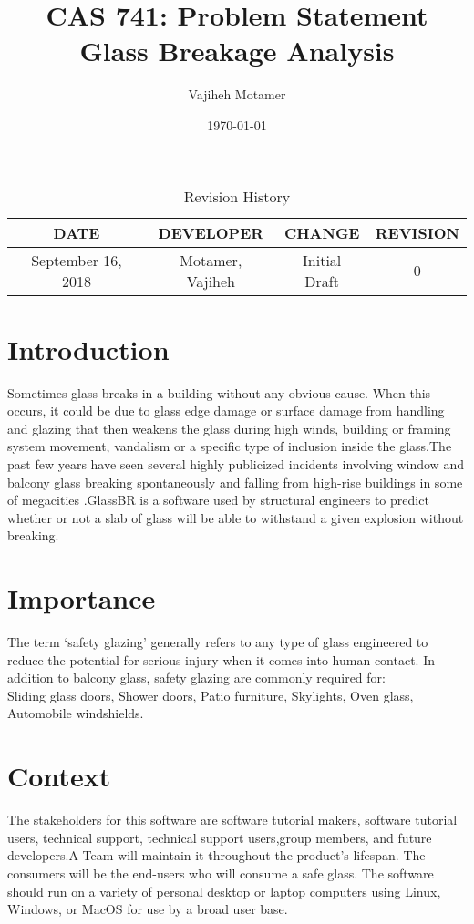 \documentclass[12pt,letterpaper]{article}
\title{CAS 741: Problem Statement\\Glass Breakage Analysis}
\author{Vajiheh Motamer}
\date{\today}
\begin{document}
\maketitle

\begin{table}[hp]
\caption{Revision History}
\begin{center}
\label{tab:}
\begin{tabular}{|c|c|c|c|}
\hline
\textbf{DATE} & \textbf{DEVELOPER} & \textbf{CHANGE} & \textbf{REVISION}\\
\hline
September 16, 2018 & Motamer, Vajiheh & Initial Draft & 0\\
\hline
\end{tabular}
\end{center}
\label{default}
\end{table}


\section{Introduction}
Sometimes glass breaks in a building without any obvious cause. When this occurs, it could be due to glass edge damage or surface damage from handling and glazing that then weakens the glass during high winds, building or framing system movement, vandalism or a specific type of inclusion inside the glass.The past few years have seen several highly publicized incidents involving window and balcony glass breaking spontaneously and falling from high-rise buildings in some of megacities .GlassBR is  a software used by structural engineers to predict whether or not a slab of glass will be able to withstand a given explosion without breaking.

\section{Importance}
The term ‘safety glazing’ generally refers to any type of glass engineered to reduce the potential for serious injury when it comes into human contact. In addition to balcony glass, safety glazing are commonly required for:\\  Sliding glass doors, Shower doors, Patio furniture, Skylights, Oven glass, Automobile windshields.


\section{Context}

The stakeholders for this software are software tutorial makers, software tutorial users, technical support, technical support users,group members, and future developers.A Team will maintain it throughout the product’s lifespan. The consumers will be the end-users who will consume a safe glass.
The software should run on a variety of personal desktop or laptop computers using Linux, Windows, or MacOS for use by a broad user base.

\end{document}
